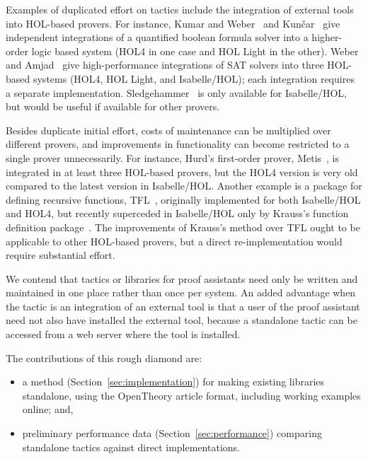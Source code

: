 \documentclass{llncs}
\newcommand{\OpenTheory}{OpenTheory\xspace}
\newcommand{\secref}[1]{Section~\ref{sec:#1}}
\begin{document}
Examples of duplicated effort on tactics include the integration of external tools into HOL-based provers.
For instance, Kumar and Weber~\cite{DBLP:conf/itp/KumarW11} and Kun\v{c}ar~\cite{DBLP:conf/itp/Kuncar11} give independent integrations of a quantified boolean formula solver into a higher-order logic based system (HOL4 in one case and HOL Light in the other).
Weber and Amjad~\cite{weber09efficiently} give high-performance integrations of SAT solvers into three HOL-based systems (HOL4, HOL Light, and Isabelle/HOL); each integration requires a separate implementation.
Sledgehammer~\cite{DBLP:journals/japll/MengP09,Paulson_threeyears,DBLP:conf/frocos/BlanchetteBN11} is only available for Isabelle/HOL, but would be useful if available for other provers.

Besides duplicate initial effort, costs of maintenance can be multiplied over different provers, and improvements in functionality can become restricted to a single prover unnecessarily.
For instance, Hurd's first-order prover, Metis~\cite{DBLP:conf/cade/Hurd02}, is integrated in at least three HOL-based provers, but the HOL4 version is very old compared to the latest version in Isabelle/HOL.
Another example is a package for defining recursive functions, TFL~\cite{slindphd}, originally implemented for both Isabelle/HOL and HOL4, but recently superceded in Isabelle/HOL only by Krauss's function definition package~\cite{DBLP:journals/jar/Krauss10}.
The improvements of Krauss's method over TFL ought to be applicable to other HOL-based provers, but a direct re-implementation would require substantial effort.

We contend that tactics or libraries for proof assistants need only be written and maintained in one place rather than once per system. 
An added advantage when the tactic is an integration of an external tool is that a user of the proof assistant need not also have installed the external tool, because a standalone tactic can be accessed from a web server where the tool is installed.

The contributions of this rough diamond are:
\begin{itemize}
\item
a method (\secref{implementation}) for making existing libraries standalone, using the \OpenTheory article format, including working examples online; and,
\item
preliminary performance data (\secref{performance}) comparing standalone tactics against direct implementations.
\end{itemize}
\end{document}
